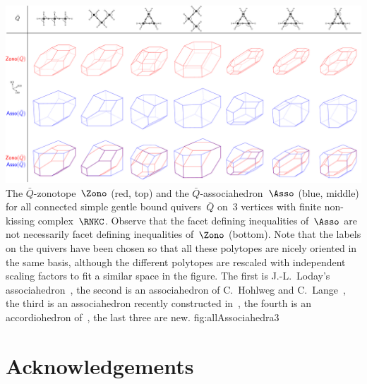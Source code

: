\documentclass{amsart}
\theoremstyle{definition}
\begin{document}
\captionsetup{width=1.5\textwidth}
{\includegraphics[scale=.27]{allAssociahedra3}}
{The $\bar Q$-zonotope~$\Zono$ (red, top) and the $\bar Q$-associahedron~$\Asso$ (blue, middle) for all connected simple gentle bound quivers~$\bar Q$ on~$3$ vertices with finite non-kissing complex~$\RNKC$. Observe that the facet defining inequalities of~$\Asso$ are not necessarily facet defining inequalities of~$\Zono$ (bottom). Note that the labels on the quivers have been chosen so that all these polytopes are nicely oriented in the same basis, although the different polytopes are rescaled with independent scaling factors to fit a similar space in the figure. The first is J.-L.~Loday's associahedron~\cite{Loday}, the second is an associahedron of C.~Hohlweg and C.~Lange~\cite{HohlwegLange}, the third is an associahedron recently constructed in~\cite{HohlwegPilaudStella}, the fourth is an accordiohedron of~\cite{MannevillePilaud-accordion}, the last three are new.}
{fig:allAssociahedra3}
\captionsetup{width=\textwidth}




\section*{Acknowledgements}
\end{document}
